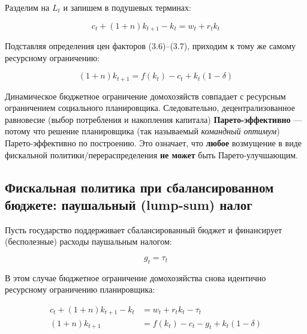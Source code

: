 \documentclass[10pt,a4paper]{article}
\begin{document}
Разделим на $L_t$ и запишем в подушевых терминах:
\begin{formulabox}
\begin{equation}
c_t + (1+n)k_{t+1} - k_t = w_t + r_t k_t \tag{3.19}
\end{equation}
\end{formulabox}

Подставляя определения цен факторов (3.6)--(3.7), приходим к тому же самому ресурсному ограничению:
\begin{formulabox}
\begin{equation}
(1+n)k_{t+1} = f(k_t) - c_t + k_t(1-\delta) \tag{3.5}
\end{equation}
\end{formulabox}
\begin{intuition}
Динамическое бюджетное ограничение домохозяйств совпадает с ресурсным ограничением социального планировщика. Следовательно, децентрализованное равновесие (выбор потребления и накопления капитала) \textbf{Парето-эффективно} — потому что решение планировщика (так называемый \textit{командный оптимум}) Парето-эффективно по построению. Это означает, что \textbf{любое} возмущение в виде фискальной политики/перераспределения \textbf{не может} быть Парето-улучшающим.
\end{intuition}

\subsection{Фискальная политика при сбалансированном бюджете: паушальный (lump-sum) налог}

Пусть государство поддерживает сбалансированный бюджет и финансирует (бесполезные) расходы паушальным налогом:
\begin{formulabox}
\begin{equation}
g_t = \tau_t \tag{3.20}
\end{equation}
\end{formulabox}

В этом случае бюджетное ограничение домохозяйства снова идентично ресурсному ограничению планировщика:
\begin{formulabox}
\begin{align}
c_t + (1+n)k_{t+1} - k_t &= w_t + r_t k_t - \tau_t \tag{3.21}\\
(1+n)k_{t+1} &= f(k_t) - c_t - g_t + k_t(1-\delta) \tag{3.22}
\end{align}
\end{formulabox}
\end{document}
